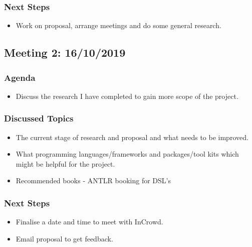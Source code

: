 \documentclass[chapterprefix=false]{scrreprt}
\begin{document}
\subsubsection{Next Steps}

\begin{itemize}
 \setlength\itemsep{-0.75em}
 \item Work on proposal, arrange meetings and do some general research.
\end{itemize}

\subsection{Meeting 2: 16/10/2019}

\subsubsection{Agenda}

\begin{itemize}
 \setlength\itemsep{-0.75em}
 \item Discuss the research I have completed to gain more scope of the project.
\end{itemize}

\subsubsection{Discussed Topics}

\begin{itemize}
 \setlength\itemsep{-0.75em}
 \item The current stage of research and proposal and what needs to be improved.
 \item What programming languages/frameworks and packages/tool kits which might be helpful for the project.
 \item Recommended books - ANTLR booking for DSL's
\end{itemize}

\subsubsection{Next Steps}

\begin{itemize}
 \setlength\itemsep{-0.75em}
 \item Finalise a date and time to meet with InCrowd.
 \item Email proposal to get feedback.
\end{itemize}
\end{document}
